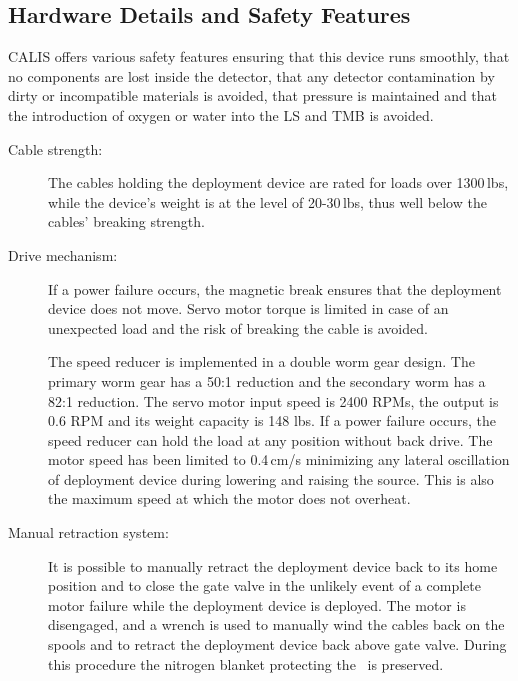 \subsection{Hardware Details and Safety Features}\label{sec:HardwareDetails}\label{sec:SafetyFeatures}
CALIS offers various safety features ensuring that this device runs smoothly, that no components are lost inside the detector, that any detector contamination by dirty or incompatible materials is avoided, that pressure is maintained and that the introduction of oxygen or water into the LS and TMB is avoided. %

\begin{description}

\item[Cable strength:]
The cables holding the deployment device are rated for loads over 1300\,lbs, while the device's weight is at the level of 20-30\,lbs, thus well below the cables' breaking strength. 

\item[Drive mechanism:]
If a power failure occurs, the magnetic break ensures that the deployment device does not move. Servo motor torque is limited in case of an unexpected load and the risk of breaking the cable is avoided.

The speed reducer is implemented in a double worm gear design. The primary worm gear has a 50:1 reduction and the secondary worm has a 82:1 reduction. The servo motor input speed is 2400 RPMs, the output is 0.6 RPM and its weight capacity is 148 lbs. If a power failure occurs, the speed reducer can hold the load at any position without back drive. The motor speed has been limited to 0.4\,cm/s minimizing any lateral oscillation of deployment device during lowering and raising the source. This is also the maximum speed at which the motor does not overheat.

\item[Manual retraction system:]
It is possible to manually retract the deployment device back to its home position and to close the gate valve in the unlikely event of a complete motor failure while the deployment device is deployed. The motor is disengaged, and a wrench is used to manually wind the cables back on the spools and to retract the deployment device back above gate valve. During this procedure the nitrogen blanket protecting the \lsv\ is preserved. 
   

\end{description}
